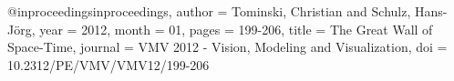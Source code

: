 @inproceedings{inproceedings,
author = {Tominski, Christian and Schulz, Hans-Jörg},
year = {2012},
month = {01},
pages = {199-206},
title = {The Great Wall of Space-Time},
journal = {VMV 2012 - Vision, Modeling and Visualization},
doi = {10.2312/PE/VMV/VMV12/199-206}
}